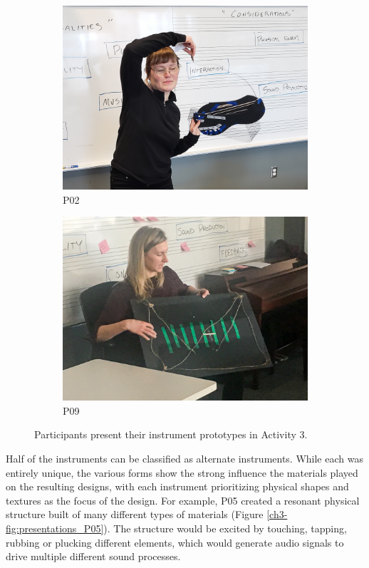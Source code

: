 \documentclass[letterpaper, 12pt]{article}
\begin{document}
\begin{figure}[htbp]
\begin{subfigure}{0.49\textwidth}
        \includegraphics[width=1\textwidth]{CMJ3.jpg}
        \caption{P02}
        \label{ch3-fig:presentations_P02}
    \end{subfigure}
    \begin{subfigure}{0.49\textwidth}
        \centering
        \includegraphics[width=1\textwidth]{CMJ4.jpg}
        \caption{P09}
        \label{ch3-fig:presentations_P09}
    \end{subfigure}
    \caption{Participants present their instrument prototypes in Activity 3.}
    \label{ch3-fig:presentations}
\end{figure}

Half of the instruments can be classified as alternate instruments. While each was entirely unique, the various forms show the strong influence the materials played on the resulting designs, with each instrument prioritizing physical shapes and textures as the focus of the design. For example, P05 created a resonant physical structure built of many different types of materials (Figure \ref{ch3-fig:presentations_P05}). The structure would be excited by touching, tapping, rubbing or plucking different elements, which would generate audio signals to drive multiple different sound processes.
\end{document}

